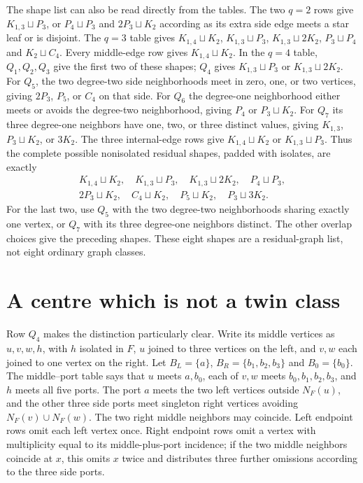 \documentclass[11pt]{article}
\newcommand{\sq}{\sqcup}
\begin{document}
The shape list can also be read directly from the tables. The two
$q=2$ rows give $K_{1,3}\sq P_3$, or $P_4\sq P_3$ and
$2P_3\sq K_2$ according as its extra side edge meets a star leaf or
is disjoint. The $q=3$ table gives $K_{1,4}\sq K_2$,
$K_{1,3}\sq P_3$, $K_{1,3}\sq2K_2$, $P_3\sq P_4$ and
$K_2\sq C_4$. Every middle-edge row gives $K_{1,4}\sq K_2$.
In the $q=4$ table, $Q_1,Q_2,Q_3$ give the first two of these shapes;
$Q_4$ gives $K_{1,3}\sq P_3$ or $K_{1,3}\sq2K_2$.
For $Q_5$, the two degree-two side neighborhoods meet in zero, one,
or two vertices, giving $2P_3$, $P_5$, or $C_4$ on that side.
For $Q_6$ the degree-one neighborhood either meets or avoids the
degree-two neighborhood, giving $P_4$ or $P_3\sq K_2$.
For $Q_7$ its three degree-one neighbors have one, two, or three
distinct values, giving $K_{1,3}$, $P_3\sq K_2$, or $3K_2$.
The three internal-edge rows give $K_{1,4}\sq K_2$ or
$K_{1,3}\sq P_3$. Thus the complete possible nonisolated residual shapes, padded
with isolates, are exactly
\[
\begin{gathered}
 K_{1,4}\sq K_2,\quad K_{1,3}\sq P_3,\quad
 K_{1,3}\sq2K_2,\quad P_4\sq P_3,\\
 2P_3\sq K_2,\quad C_4\sq K_2,\quad
 P_5\sq K_2,\quad P_3\sq3K_2.
\end{gathered}
\]
For the last two, use $Q_5$ with the two degree-two neighborhoods
sharing exactly one vertex, or $Q_7$ with its three degree-one neighbors
distinct. The other overlap choices give the preceding shapes. These
eight shapes are a residual-graph list, not eight ordinary graph classes.

\section{A centre which is not a twin class}

Row $Q_4$ makes the distinction particularly clear. Write its middle
vertices as $u,v,w,h$, with $h$ isolated in $F$, $u$ joined to three
vertices on the left, and $v,w$ each joined to one vertex on the right.
Let $B_L=\{a\}$, $B_R=\{b_1,b_2,b_3\}$ and $B_0=\{b_0\}$.
The middle--port table says that $u$ meets $a,b_0$, each of $v,w$
meets $b_0,b_1,b_2,b_3$, and $h$ meets all five ports.
The port $a$ meets the two left vertices outside $N_F(u)$, and the
other three side ports meet singleton right vertices avoiding
$N_F(v)\cup N_F(w)$. The two right middle neighbors may coincide.
Left endpoint rows omit each left vertex once. Right endpoint rows
omit a vertex with multiplicity equal to its middle-plus-port incidence;
if the two middle neighbors coincide at $x$, this omits $x$ twice and
distributes three further omissions according to the three side ports.
\end{document}
